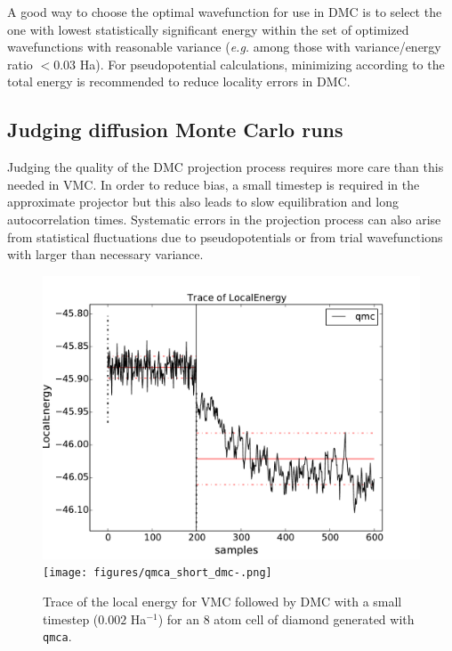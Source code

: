 A good way to choose the optimal wavefunction for use in DMC is to select 
the one with lowest statistically significant energy within the set of 
optimized wavefunctions with reasonable variance (\emph{e.g.} among 
those with variance/energy ratio $<0.03$ Ha).  For pseudopotential 
calculations, minimizing according to the total energy is recommended 
to reduce locality errors in DMC.


\subsection{Judging diffusion Monte Carlo runs}
\label{sec:qmca_judge_dmc}
Judging the quality of the DMC projection process requires more 
care than this needed in VMC.  In order to reduce bias, a small 
timestep is required in the approximate projector but this also 
leads to slow equilibration and long autocorrelation times.  
Systematic errors in the projection process can also arise from 
statistical fluctuations due to pseudopotentials or from trial 
wavefunctions with larger than necessary variance.

\begin{figure}
\begin{center}
\ifpdf
\includegraphics[trim = 0mm 0mm 0mm 0mm,clip,width=0.75\columnwidth]{figures/qmca_short_dmc.pdf}
\else
\texttt{[image: figures/qmca\_short\_dmc-.png]}
\fi
\end{center}
\caption{Trace of the local energy for VMC followed by DMC with a small timestep ($0.002$ Ha$^{-1}$) for an 8 atom cell of diamond generated with \texttt{qmca}.}
\label{fig:qmca_short_dmc}
\end{figure}

